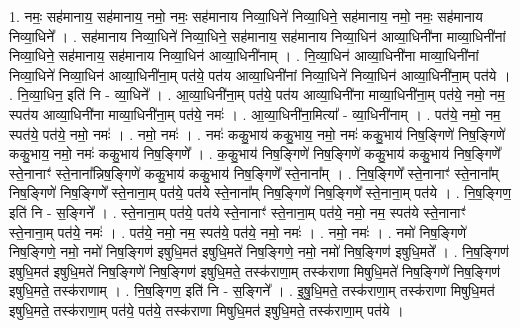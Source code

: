 \documentclass[17pt]{extarticle}
\begin{document}
1. नमः॒ सह॑मानाय॒ सह॑मानाय॒ नमो॒ नमः॒ सह॑मानाय निव्या॒धिने॑ निव्या॒धिने॒ सह॑मानाय॒ नमो॒ नमः॒ सह॑मानाय निव्या॒धिने᳚ । . सह॑मानाय निव्या॒धिने॑ निव्या॒धिने॒ सह॑मानाय॒ सह॑मानाय निव्या॒धिन॑ आव्या॒धिनी॑ना माव्या॒धिनी॑नां निव्या॒धिने॒ सह॑मानाय॒ सह॑मानाय निव्या॒धिन॑ आव्या॒धिनी॑नाम् । . नि॒व्या॒धिन॑ आव्या॒धिनी॑ना माव्या॒धिनी॑नां निव्या॒धिने॑ निव्या॒धिन॑ आव्या॒धिनी॑ना॒म् पत॑ये॒ पत॑य आव्या॒धिनी॑नां निव्या॒धिने॑ निव्या॒धिन॑ आव्या॒धिनी॑ना॒म् पत॑ये । . नि॒व्या॒धिन॒ इति॑ नि - व्या॒धिने᳚ । . आ॒व्या॒धिनी॑ना॒म् पत॑ये॒ पत॑य आव्या॒धिनी॑ना माव्या॒धिनी॑ना॒म् पत॑ये॒ नमो॒ नम॒ स्पत॑य आव्या॒धिनी॑ना माव्या॒धिनी॑ना॒म् पत॑ये॒ नमः॑ । . आ॒व्या॒धिनी॑ना॒मित्या᳚ - व्या॒धिनी॑नाम् । . पत॑ये॒ नमो॒ नम॒ स्पत॑ये॒ पत॑ये॒ नमो॒ नमः॑ । . नमो॒ नमः॑ । . नमः॑ ककु॒भाय॑ ककु॒भाय॒ नमो॒ नमः॑ ककु॒भाय॑ निष॒ङ्गिणे॑ निष॒ङ्गिणे॑ ककु॒भाय॒ नमो॒ नमः॑ ककु॒भाय॑ निष॒ङ्गिणे᳚ । . क॒कु॒भाय॑ निष॒ङ्गिणे॑ निष॒ङ्गिणे॑ ककु॒भाय॑ ककु॒भाय॑ निष॒ङ्गिणे᳚ स्ते॒नानाꣳ॑ स्ते॒नाना᳚न्निष॒ङ्गिणे॑ ककु॒भाय॑ ककु॒भाय॑ निष॒ङ्गिणे᳚ स्ते॒नाना᳚म् । . नि॒ष॒ङ्गिणे᳚ स्ते॒नानाꣳ॑ स्ते॒नाना᳚म् निष॒ङ्गिणे॑ निष॒ङ्गिणे᳚ स्ते॒नाना॒म् पत॑ये॒ पत॑ये 
स्ते॒नाना᳚म् निष॒ङ्गिणे॑ निष॒ङ्गिणे᳚ स्ते॒नाना॒म् पत॑ये । . नि॒ष॒ङ्गिण॒ इति॑ नि - स॒ङ्गिने᳚ । . स्ते॒नाना॒म् पत॑ये॒ पत॑ये स्ते॒नानाꣳ॑ स्ते॒नाना॒म् पत॑ये॒ नमो॒ नम॒ स्पत॑ये स्ते॒नानाꣳ॑ स्ते॒नाना॒म् पत॑ये॒ नमः॑ । . पत॑ये॒ नमो॒ नम॒ स्पत॑ये॒ पत॑ये॒ नमो॒ नमः॑ । . नमो॒ नमः॑ । . नमो॑ निष॒ङ्गिणे॑ निष॒ङ्गिणे॒ नमो॒ नमो॑ निष॒ङ्गिण॑ इषुधि॒मत॑ इषुधि॒मते॑ निष॒ङ्गिणे॒ नमो॒ नमो॑ निष॒ङ्गिण॑ इषुधि॒मते᳚ । . नि॒ष॒ङ्गिण॑ इषुधि॒मत॑ इषुधि॒मते॑ निष॒ङ्गिणे॑ निष॒ङ्गिण॑ इषुधि॒मते॒ तस्क॑राणा॒म् तस्क॑राणा मिषुधि॒मते॑ निष॒ङ्गिणे॑ निष॒ङ्गिण॑ इषुधि॒मते॒ तस्क॑राणाम् । . नि॒ष॒ङ्गिण॒ इति॑ नि - स॒ङ्गिने᳚ । . इ॒षु॒धि॒मते॒ तस्क॑राणा॒म् तस्क॑राणा मिषुधि॒मत॑ इषुधि॒मते॒ तस्क॑राणा॒म् पत॑ये॒ पत॑ये॒ तस्क॑राणा मिषुधि॒मत॑ इषुधि॒मते॒ तस्क॑राणा॒म् पत॑ये । \newline
\end{document}
